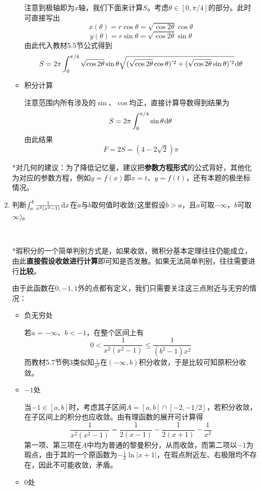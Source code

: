 \documentclass[a4paper,UTF8,fontset=windows]{ctexart}
\newcommand*{\dr}{\hspace{0.07em}\mathrm{d}}
\begin{document}
\begin{enumerate}
\begin{itemize}
        注意到极轴即为$x$轴，我们下面来计算$S$。考虑$\theta\in[0,\pi/4]$的部分。此时可直接写出
        $$x(\theta)=r\cos\theta=\sqrt{\cos2\theta}\cos\theta$$
        $$y(\theta)=r\sin\theta=\sqrt{\cos2\theta}\sin\theta$$
        由此代入教材5.5节公式得到
        $$S=2\pi\int_0^{\pi/4}\sqrt{\cos2\theta}\sin\theta\sqrt{(\sqrt{\cos2\theta}\cos\theta)^{'2}+(\sqrt{\cos2\theta}\sin\theta)^{'2}}\dr\theta$$

        \item 积分计算
        
        注意范围内所有涉及的$\sin$、$\cos$均正，直接计算导数得到结果为
        $$S=2\pi\int_0^{\pi/4}\sin\theta\dr\theta$$
        由此结果
        $$F=2S=(4-2\sqrt{2})\pi$$
    \end{itemize}

    *对几何的建议：为了降低记忆量，建议把\textbf{参数方程形式}的公式背好，其他化为对应的参数方程，例如$y=f(x)$即$x=t$、$y=f(t)$，还有本题的极坐标情况。
    
    \item 判断$\int_a^b\frac{1}{x^2(x^2-1)}\dr x$在$a$与$b$取何值时收敛(这里假设$b>a$，且$a$可取$-\infty$，$b$可取$\infty$)。

    \

    *瑕积分的一个简单判别方式是，如果收敛，微积分基本定理往往仍能成立，由此\textbf{直接假设收敛进行计算}即可知是否发散。如果无法简单判别，往往需要进行\textbf{比较}。

    由于此函数在$0,-1,1$外的点都有定义，我们只需要关注这三点附近与无穷的情况：
    \begin{itemize}
        \item 负无穷处
        
        若$a=-\infty$、$b<-1$，在整个区间上有
        $$0<\frac{1}{x^2(x^2-1)}\le\frac{1}{(b^2-1)x^2}$$
        而教材5.7节例3类似知$\frac{1}{x^2}$在$(-\infty,b)$积分收敛，于是比较可知原积分收敛。

        \item $-1$处
        
        当$-1\in[a,b]$时，考虑其子区间$A=[a,b]\cap[-2,-1/2]$，若积分收敛，在子区间上的积分也应收敛。由有理函数的展开可计算得
        $$\frac{1}{x^2(x^2-1)}=\frac{1}{2(x-1)}-\frac{1}{2(x+1)}-\frac{1}{x^2}$$
        第一项、第三项在$A$中均为普通的黎曼积分，从而收敛，而第二项以$-1$为瑕点，由于其的一个原函数为$-\frac{1}{2}\ln|x+1|$，在瑕点附近左、右极限均不存在，因此不可能收敛，矛盾。

        \item 0处
        

\end{itemize}
\end{enumerate}
\end{document}
